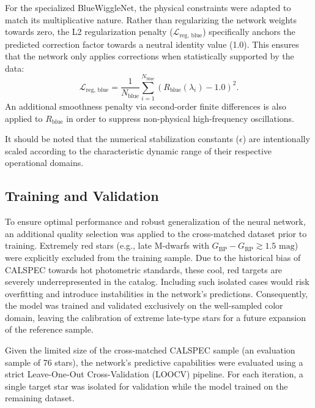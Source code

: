 \documentclass{aa}
\begin{document}
For the specialized BlueWiggleNet, the physical constraints were adapted to match its multiplicative nature. Rather than regularizing the network weights towards zero, the L2 regularization penalty ($\mathcal{L}_{\text{reg, blue}}$) specifically anchors the predicted correction factor towards a neutral identity value (1.0). This ensures that the network only applies corrections when statistically supported by the data:
\begin{equation}
    \mathcal{L}_{\text{reg, blue}} = \frac{1}{N_{\text{blue}}} \sum_{i=1}^{N_{\text{blue}}} (R_{\text{blue}}(\lambda_i) - 1.0)^2.
\end{equation}
An additional smoothness penalty via second-order finite differences is also applied to $R_{\text{blue}}$ in order to suppress non-physical high-frequency oscillations.

It should be noted that the numerical stabilization constants ($\epsilon$) are intentionally scaled according to the characteristic dynamic range of their respective operational domains.


\subsection{Training and Validation} \label{sec:train_val}
To ensure optimal performance and robust generalization of the neural network, an additional quality selection was applied to the cross-matched dataset prior to training. Extremely red stars (e.g., late M-dwarfs with $G_{\text{BP}} - G_{\text{RP}} \gtrsim 1.5\text{ mag}$) were explicitly excluded from the training sample. Due to the historical bias of CALSPEC towards hot photometric standards, these cool, red targets are severely underrepresented in the catalog. Including such isolated cases would risk overfitting and introduce instabilities in the network's predictions. Consequently, the model was trained and validated exclusively on the well-sampled color domain, leaving the calibration of extreme late-type stars for a future expansion of the reference sample.

Given the limited size of the cross-matched CALSPEC sample (an evaluation sample of 76 stars), the network's predictive capabilities were evaluated using a strict Leave-One-Out Cross-Validation (LOOCV) pipeline. For each iteration, a single target star was isolated for validation while the model trained on the remaining dataset.
\end{document}
